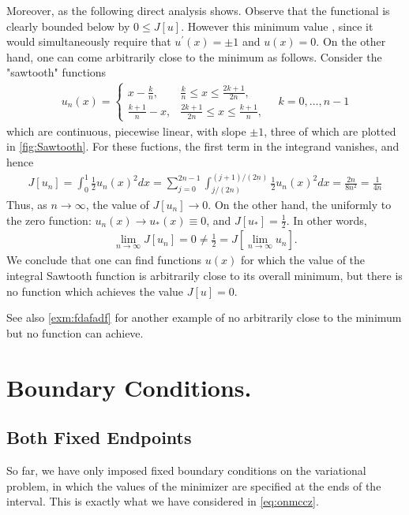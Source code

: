 \documentclass{article}
\begin{document}
Moreover,  as the following direct analysis shows. Observe that the functional is clearly bounded below by $0 \leq J[u]$. However this minimum value , since it would simultaneously require that $u^{\prime}(x)=\pm 1$ and $u(x)=0 .$ On the other hand, one can come arbitrarily close to the minimum as follows. Consider the "sawtooth" functions
\begin{align*}
u_{n}(x)=\left\{\begin{array}{ll}
x-\frac{k}{n}, & \frac{k}{n} \leq x \leq \frac{2 k+1}{2 n}, \\
\frac{k+1}{n}-x, & \frac{2 k+1}{2 n} \leq x \leq \frac{k+1}{n},
\end{array} \quad k=0, \ldots, n-1\right.
\end{align*}
which are continuous, piecewise linear, with slope $\pm 1$, three of which are plotted in  \cref{fig:Sawtooth}. For these fuctions, the first term in the integrand vanishes, and hence
\begin{align*}
J\left[u_{n}\right]=\int_{0}^{1} \frac{1}{2} u_{n}(x)^{2} d x=\sum_{j=0}^{2 n-1} \int_{j /(2 n)}^{(j+1) /(2 n)} \frac{1}{2} u_{n}(x)^{2} d x=\frac{2 n}{8 n^{2}}=\frac{1}{4 n}
\end{align*}
Thus, as $n \rightarrow \infty$, the value of $J\left[u_{n}\right] \rightarrow 0 .$ On the other hand, the uniformly to the zero function: $u_{n}(x) \rightarrow u_{*}(x) \equiv 0$, and $J\left[u_{*}\right]=\frac{1}{2}$. In other words, 
\begin{align*} \lim _{n \rightarrow \infty} J\left[u_{n}\right]=0 \neq \frac{1}{2}=J\left[\lim _{n \rightarrow \infty} u_{n}\right] . \end{align*}
We conclude that one can find functions $u(x)$ for which the value of the integral Sawtooth function is arbitrarily close to its overall minimum, but there is no function which achieves the value $J[u]=0$.
\begin{rema}
See also \cref{exm:fdafadf} for another example of no arbitrarily close to the minimum but no function can achieve.
\end{rema}

\section{Boundary Conditions.}
\subsection{Both Fixed  Endpoints}
So far, we have only imposed fixed boundary conditions on the variational problem, in which the values of the minimizer are specified at the ends of the interval.  This is exactly what we have considered in \cref{eq:onmccz}.
\end{document}
